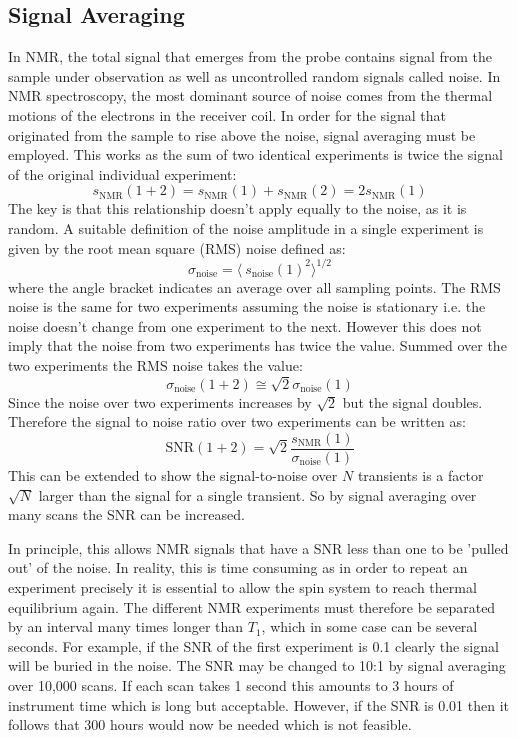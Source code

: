\subsection{Signal Averaging}\label{Signal Averaging}

In NMR, the total signal that emerges from the probe contains signal from the sample
under observation as well as uncontrolled random signals called noise. In NMR spectroscopy, the most dominant source of noise comes
from the thermal motions of the electrons
in the receiver coil. In order for the signal that originated from the sample to rise above the noise,
signal averaging must be employed. This works as the sum of two identical experiments is twice the signal
of the original individual experiment:
\begin{equation}
  s_\text{NMR}(1+2) = s_\text{NMR}(1) + s_\text{NMR}(2) = 2s_\text{NMR}(1)
\end{equation}
The key is that this relationship doesn't apply equally to the noise, as it is random. A suitable
definition of the noise amplitude in a single experiment is given by the root mean square (RMS) noise defined
as:
\begin{equation}
  \sigma_\text{noise} = \langle~s_{\text{noise}}(1)^2\rangle^{1/2}
\end{equation}
where the angle bracket indicates an average over all sampling points. The RMS noise is the same for two
experiments assuming the noise is stationary i.e. the noise doesn't change from one experiment to the next.
However this does not imply that the noise from two experiments has twice the value. Summed over the two experiments
the RMS noise takes the value:
\begin{equation}
  \sigma_\text{noise}(1+2) \cong \sqrt{2} \sigma_{\text{noise}}(1)
\end{equation}
Since the noise over two experiments increases by $\sqrt{2}$ but the signal doubles. Therefore the signal to noise
ratio over two experiments can be written as:
\begin{equation}
  \text{SNR}(1+2) = \sqrt{2}\frac{s_{\text{NMR}}(1)}{\sigma_{\text{noise}}(1)}
\end{equation}
This can be extended to show the signal-to-noise over $N$ transients is a factor $\sqrt{N}$ larger than the
signal for a single transient. So by signal averaging over many scans the SNR can be increased.

In principle, this allows NMR signals that have a SNR less than one to be 'pulled out' of the noise. In reality, this is
time consuming as in order to repeat an experiment precisely it is essential to allow the spin system to
reach thermal equilibrium again. The different NMR experiments must therefore be separated by an interval
many times longer than $T_1$, which in some case can be several seconds. For example, if the SNR of the first
experiment is 0.1 clearly the signal will be buried in the noise. The SNR may be changed to 10:1 by signal averaging
over 10,000 scans. If each scan takes 1 second this amounts to 3 hours of instrument time which is long but
acceptable. However, if the SNR is 0.01 then it follows that 300 hours would now be needed which is not feasible.

